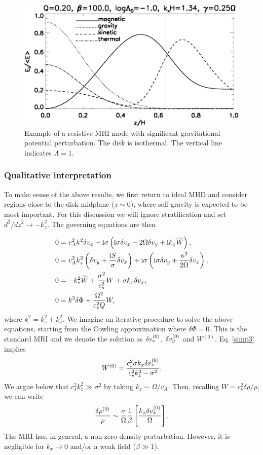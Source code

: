\begin{figure}
  \includegraphics[width=\linewidth]{figures/result_resis_sg}
  \caption{Example of a resistive MRI mode with significant
    gravitational potential perturbation. The disk is isothermal. 
    The vertical line
    indicates $\Lambda=1$.  
    \label{mri_massive_resis}}
\end{figure}

\subsubsection{Qualitative interpretation} 
To make sense of the above results, we first return to ideal MHD and 
consider regions close to the disk midplane ($z\sim 0$), where
self-gravity is expected to be most important. For this discussion we
will ignore stratification and set $d^2/dz^2\to -k_z^2$. The governing
equations are then 

\begin{align}
  &  0= v_A^2k^2\delta v_x + \mathrm{i}\sigma\left(\mathrm{i}\sigma \delta v_x - 2\Omega\delta v_y + \mathrm{i} k_x \widetilde{W}\right),\label{simp1}\\
  &  0= v_A^2k_z^2\left(\delta v_y + \frac{\mathrm{i} S
  }{\sigma}\delta v_x\right) + \mathrm{i}\sigma\left(\mathrm{i}\sigma\delta v_y +
  \frac{\kappa^2}{2\Omega}\delta v_x\right),\label{simp2}\\
  & 0 = -k_z^2\widetilde{W} + \frac{\sigma^2}{c_s^2}W + \sigma k_x \delta v_x, \label{simp3}\\
  & 0 = k^2\delta \Phi + \frac{\Omega^2}{c_s^2Q}W,\label{simp4}
\end{align}
where $k^2 = k_z^2 + k_x^2$. We imagine an iterative procedure to
solve the above equations, starting from the Cowling approximation
where $\delta\Phi=0$. This is the standard MRI and we denote the
solution as $\delta v_x^{(0)}$, $\delta v_y^{(0)}$ and $W^{(0)}$. Eq. \ref{simp3} implies
\begin{align}
  W^{(0)} = \frac{c_s^2\sigma k_x \delta v_x^{(0)}}{c_s^2k_z^2 - \sigma^2}. 
\end{align}
We argue below that $c_s^2k_z^2\gg \sigma^2$ by taking $k_z\sim
\Omega/v_A$. Then, recalling $W=c_s^2\delta\rho/\rho$, we can write
\begin{align}
  \frac{\delta\rho^{(0)}}{\rho} \sim
  \frac{\sigma}{\Omega}\frac{1}{\beta}\left[\frac{k_x\delta v_x^{(0)}}{\Omega}\right].   
\end{align}
The MRI has, in general, a non-zero density perturbation. However, it
is negligible for $k_x\to 0$ and/or a weak field ($\beta \gg 1$). 

